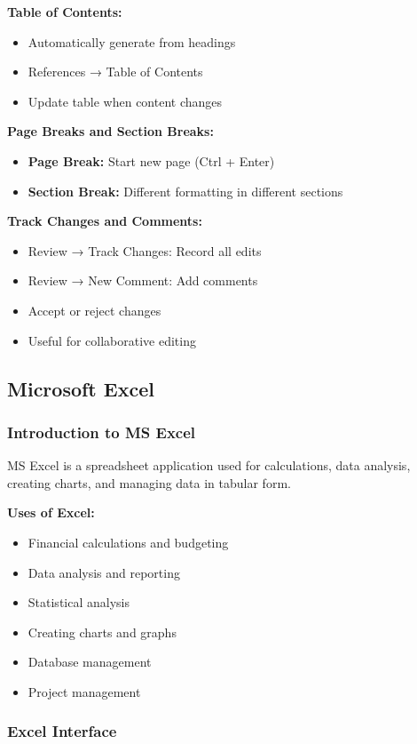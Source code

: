 \documentclass[12pt,a4paper]{article}
\begin{document}
\textbf{Table of Contents:}
\begin{itemize}
    \item Automatically generate from headings
    \item References → Table of Contents
    \item Update table when content changes
\end{itemize}

\textbf{Page Breaks and Section Breaks:}
\begin{itemize}
    \item \textbf{Page Break:} Start new page (Ctrl + Enter)
    \item \textbf{Section Break:} Different formatting in different sections
\end{itemize}

\textbf{Track Changes and Comments:}
\begin{itemize}
    \item Review → Track Changes: Record all edits
    \item Review → New Comment: Add comments
    \item Accept or reject changes
    \item Useful for collaborative editing
\end{itemize}

\subsection{Microsoft Excel}

\subsubsection{Introduction to MS Excel}
MS Excel is a spreadsheet application used for calculations, data analysis, creating charts, and managing data in tabular form.

\textbf{Uses of Excel:}
\begin{itemize}
    \item Financial calculations and budgeting
    \item Data analysis and reporting
    \item Statistical analysis
    \item Creating charts and graphs
    \item Database management
    \item Project management
\end{itemize}

\subsubsection{Excel Interface}
\end{document}

